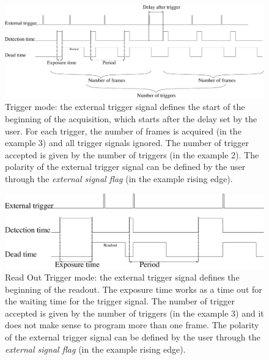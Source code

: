 \begin{figure}
\begin{center}
\includegraphics[width=\textwidth]{images/trigger_acquisition.eps}
\end{center}
\caption{Trigger mode: the external trigger signal defines the start of the beginning of the acquisition, which starts after the delay set by the user. For each trigger, the number of frames is acquired (in the example 3) and all trigger signals ignored. The number of trigger accepted is given by the number of triggers (in the example 2). The polarity of the external trigger signal can be defined by the user through the \textit{external signal flag} (in the example rising edge).}\label{fig:trig}
\end{figure}


\begin{figure}
\begin{center}
\includegraphics[width=\textwidth]{images/ro_trigger_acquisition.eps}
\end{center}
\caption{Read Out Trigger mode: the external trigger signal defines the beginning of the readout. The exposure time works as a time out for the waiting time for the trigger signal. The number of trigger accepted is given by the number of triggers (in the example 3) and it does not make sense to program more than one frame. The polarity of the external trigger signal can be defined by the user through the \textit{external signal flag} (in the example rising edge).}\label{fig:trig}
\end{figure}



